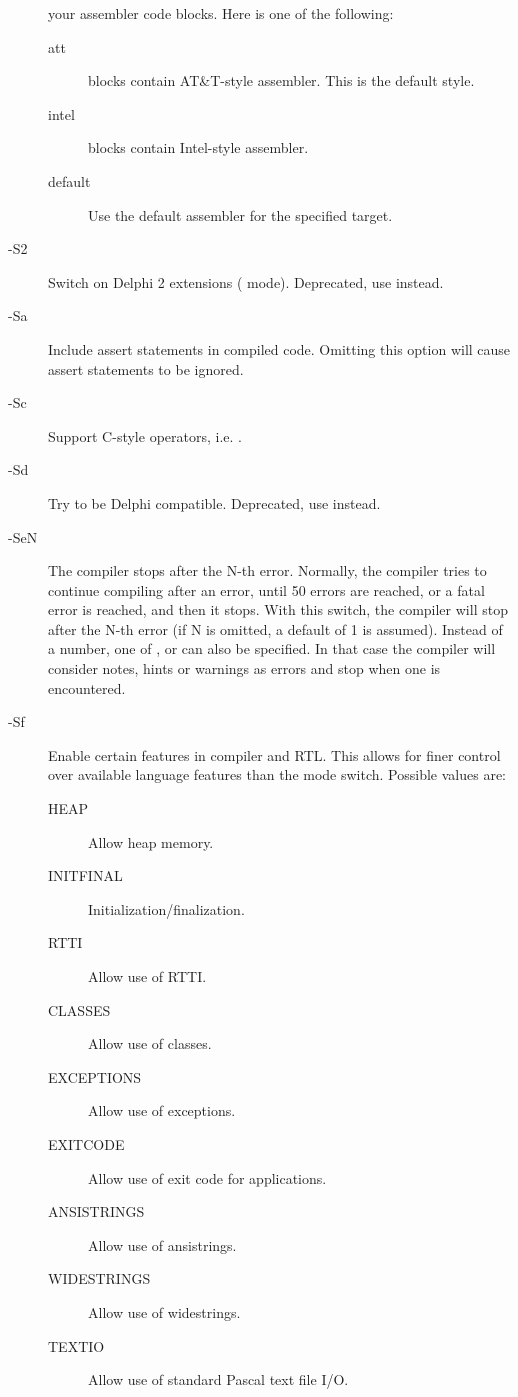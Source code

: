 \begin{description}
your  assembler code blocks. Here  is one of the following:
\begin{description}
\item [att\ ]  blocks contain AT\&T-style  assembler.
This is the default style.
\item [intel]  blocks contain Intel-style assembler.
\item [default] Use the default assembler for the specified target.
\end{description}
\item [-S2]  Switch on Delphi 2 extensions ( mode).
Deprecated, use  instead.
\item [-Sa]  Include assert statements in compiled code. Omitting
this option will cause assert statements to be ignored.
\item [-Sc]  Support C-style operators, i.e. .
\item [-Sd]  Try to be Delphi compatible. Deprecated, use
 instead.
\item [-SeN]  The compiler stops after the N-th error. Normally,
the compiler tries to continue compiling after an error, until 50 errors are
reached, or a fatal error is reached, and then it stops. With this switch,
the compiler will stop after the N-th error (if N is omitted, a default of 1
is assumed). Instead of a number, one of ,  or  can also be
specified.
In that case the compiler will consider notes, hints or warnings as errors and
stop when one is encountered.
\item[-Sf] Enable certain features in compiler and RTL. This allows for
finer control over available language features than the mode switch.
Possible values are:
\begin{description}
\item[HEAP] Allow heap memory.
\item[INITFINAL] Initialization/finalization.
\item[RTTI] Allow use of RTTI.
\item[CLASSES] Allow use of classes.
\item[EXCEPTIONS] Allow use of exceptions.
\item[EXITCODE] Allow use of exit code for applications.
\item[ANSISTRINGS] Allow use of ansistrings.
\item[WIDESTRINGS] Allow use of widestrings.
\item[TEXTIO] Allow use of standard  Pascal text file I/O.

\end{description}
\end{description}
